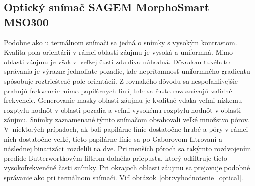   \subsection{Optický snímač SAGEM MorphoSmart MSO300}
  Podobne ako u termálnom snímači sa jedná o snímky s vysokým kontrastom. Kvalita poľa orientácií v rámci oblasti záujmu je vysoká a uniformná. Mimo oblasti
  záujmu je však z~veľkej časti zdanlivo náhodná. Dôvodom takéhoto správania je výrazne jednoliate pozadie, kde neprítomnosť uniformného gradientu spôsobuje
  roztrieštené pole orientácií. Z rovnakého dôvodu sa nespoľahlivejšie prahujú frekvencie mimo papilárnych línií, kde sa často rozoznávajú validné frekvencie.
  Generovanie masky oblasti záujmu je kvalitné vďaka veľmi nízkemu rozptylu hodnôt v oblasti pozadia a veľmi vysokému rozptylu hodnôt
  v oblasti záujmu.
  Snímky zaznamenané týmto snímačom obsahovali veľké množstvo pórov. V~niektorých prípadoch, ak boli papilárne línie dostatočne hrubé a póry v rámci nich
  dostatočne veľké, tieto papilárne línie sa po Gaborovom filtrovaní a následnej binarizácii rozdelili na dve. Pri menších póroch sa takýmto rozdvojením
  predíde Butterworthovým filtrom dolného priepustu, ktorý odfiltruje tieto vysokofrekvenčné časti snímky. Pri okrajoch oblasti záujmu sa prejavuje podobné
  správanie ako pri termálnom snímači.
  Viď obrázok~{\ref{obr:vyhodnotenie_optical}}.
